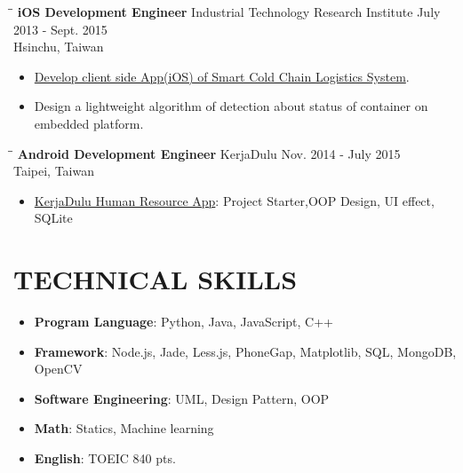 \documentclass{res}
\begin{document}
\begin{resume}
\begin{itemize}
				\end{itemize}
				\begin{tabbing}
	 				\hspace{2.3in}\= \hspace{2.6in}\= \kill %
					{\bf iOS Development Engineer} \>Industrial Technology Research Institute	
					\>July 2013 - Sept. 2015\\
													\>Hsinchu, Taiwan
	 			\end{tabbing}
	 			\vspace{-20pt}
	 			\vspace{0.2in}	
				\begin{itemize}
					\item \href{http://www.ece.uci.edu/~chou/pdf/chou-ithings14container2.pdf}{Develop client side App(iOS) of Smart Cold Chain Logistics System}.
					\vspace{-0.05in}	
					\item Design a lightweight algorithm of detection about status of container on embedded platform.
				\end{itemize}
				\begin{tabbing}%
					\hspace{2.3in}\= \hspace{2.6in}\= \kill %
	 				{\bf Android Development Engineer }  \>KerjaDulu\> Nov. 2014 - July 2015\\
													\>Taipei, Taiwan
				\end{tabbing}
				\vspace{-20pt}
				\vspace{0.2in}	
				\begin{itemize}
					\item {\href{https://play.google.com/store/apps/details?id=com.kerjadulu.kerjadulu&hl=zh_TW}{KerjaDulu Human Resource App}}: Project Starter,OOP Design, UI effect, SQLite
				\end{itemize}

			
			\section{TECHNICAL SKILLS}          
				\begin{itemize}
					\item {\bf Program Language}: Python, Java, JavaScript, C++
					\vspace{-0.05in}
					\item {\bf Framework}: Node.js, Jade, Less.js, PhoneGap, Matplotlib, SQL, MongoDB, OpenCV
					\vspace{-0.05in}
					\item {\bf Software Engineering}: UML, Design Pattern, OOP
					\vspace{-0.05in}
					\item {\bf Math}: Statics, Machine learning	
					\vspace{-0.05in}
					\item {\bf English}: TOEIC 840 pts.
				\end{itemize}


\end{resume}
\end{document}
